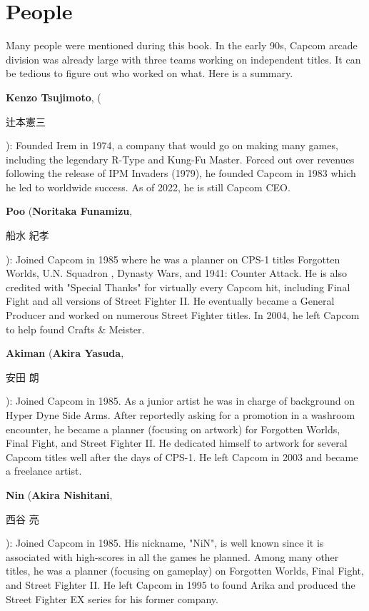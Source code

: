\chapter{People} 
\label{people}

Many people were mentioned during this book. In the early 90s, Capcom arcade division was already large with three teams working on independent titles. It can be tedious to figure out who worked on what. Here is a summary.

\textbf{Kenzo Tsujimoto}, (\begin{CJK}{UTF8}{min}辻本憲三\end{CJK}): Founded Irem in 1974, a company that would go on making many games, including the legendary R-Type and Kung-Fu Master. Forced out over revenues following the release of IPM Invaders (1979), he founded Capcom in 1983 which he led to worldwide success. As of 2022, he is still Capcom CEO. 

\textbf{Poo} (\textbf{Noritaka Funamizu}, \begin{CJK}{UTF8}{min}船水 紀孝\end{CJK}): Joined Capcom in 1985 where he was a planner on CPS-1 titles Forgotten Worlds, U.N. Squadron , Dynasty Wars, and 1941: Counter Attack. He is also credited with "Special Thanks" for virtually every Capcom hit, including Final Fight and all versions of Street Fighter II. He eventually became a General Producer and worked on numerous Street Fighter titles. In 2004, he left Capcom to help found Crafts \& Meister.

\textbf{Akiman} (\textbf{Akira Yasuda}, \begin{CJK}{UTF8}{min}安田 朗\end{CJK}): Joined Capcom in 1985. As a junior artist he was in charge of background on Hyper Dyne Side Arms. After reportedly asking for a promotion in a washroom encounter, he became a planner (focusing on artwork) for Forgotten Worlds, Final Fight, and Street Fighter II. He dedicated himself to artwork for several Capcom titles well after the days of CPS-1. He left Capcom in 2003 and became a freelance artist.

\textbf{Nin} (\textbf{Akira Nishitani}, \begin{CJK}{UTF8}{min}西谷 亮\end{CJK}): Joined Capcom in 1985. His nickname, "NiN", is well known since it is associated with high-scores in all the games he planned. Among many other titles, he was a planner (focusing on gameplay) on Forgotten Worlds, Final Fight, and Street Fighter II. He left Capcom in 1995 to found Arika and produced the Street Fighter EX series for his former company.


